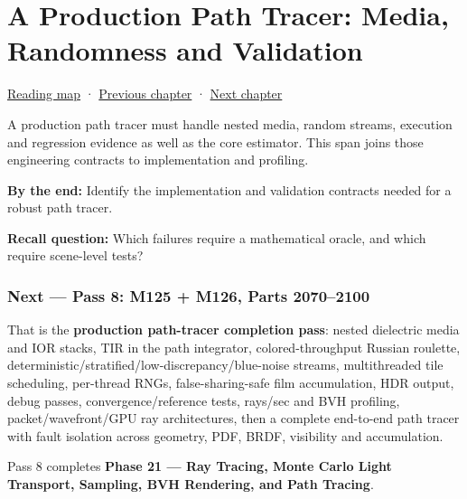 \chapter{A Production Path Tracer: Media, Randomness and Validation}\label{03-visual-computing-i-ch010-a-production-path-tracer-media-randomness-and-validation}\hypertarget{03-visual-computing-i-ch010}{}\label{stagechapter:03-visual-computing-i-ch010}

\hypertarget{03-visual-computing-i-ch010-a-production-path-tracer-media-randomness-and-validation}{}

\hyperref[volume-reading-map]{Reading map} · \hyperref[03-visual-computing-i-ch009-point-lights-mis-and-environment-lighting]{Previous chapter} · \hyperref[03-visual-computing-i-ch014]{Next chapter}

A production path tracer must handle nested media, random streams, execution and regression evidence as well as the core estimator. This span joins those engineering contracts to implementation and profiling.

\textbf{By the end:} Identify the implementation and validation contracts needed for a robust path tracer.

\textbf{Recall question:} Which failures require a mathematical oracle, and which require scene-level tests?

\subsection{Next --- Pass 8: M125 + M126, Parts 2070--2100}\label{03-visual-computing-i-ch010-next-pass-8-m125-m126-parts-20702100}

\hypertarget{03-visual-computing-i-ch010-next-pass-8-m125-m126-parts-20702100}{}

That is the \textbf{production path-tracer completion pass}: nested dielectric media and IOR stacks, TIR in the path integrator, colored-throughput Russian roulette, deterministic/stratified/low-discrepancy/blue-noise streams, multithreaded tile scheduling, per-thread RNGs, false-sharing-safe film accumulation, HDR output, debug passes, convergence/reference tests, rays/sec and BVH profiling, packet/wavefront/GPU ray architectures, then a complete end-to-end path tracer with fault isolation across geometry, PDF, BRDF, visibility and accumulation.

Pass 8 completes \textbf{Phase 21 --- Ray Tracing, Monte Carlo Light Transport, Sampling, BVH Rendering, and Path Tracing}.

